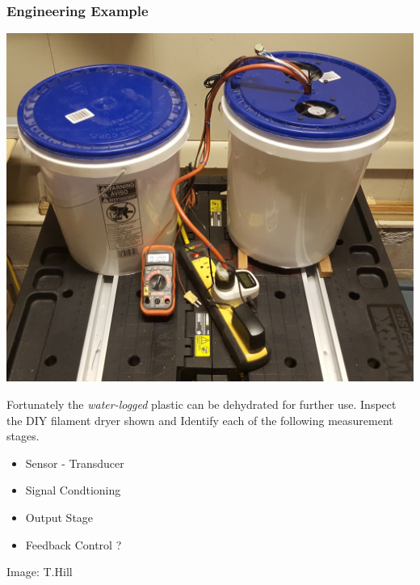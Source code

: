 \documentclass[fleqn]{beamer} %
\begin{document}
\begin{frame}
\frametitle{Engineering Example}

\begin{multicols}{2}

\includegraphics[scale=0.055]{filament_dryer_fig2.jpg}


\small
\vspace{10mm}Fortunately the {\it water-logged} plastic can be dehydrated for further use.\vspcc
Inspect the DIY filament dryer shown and Identify each of the following measurement stages.

\begin{itemize}
\item Sensor - Transducer
\item Signal Condtioning
\item Output Stage
\item Feedback Control ?
\end{itemize}

\end{multicols}

{\tiny Image: T.Hill}
\end{frame}
\end{document}
